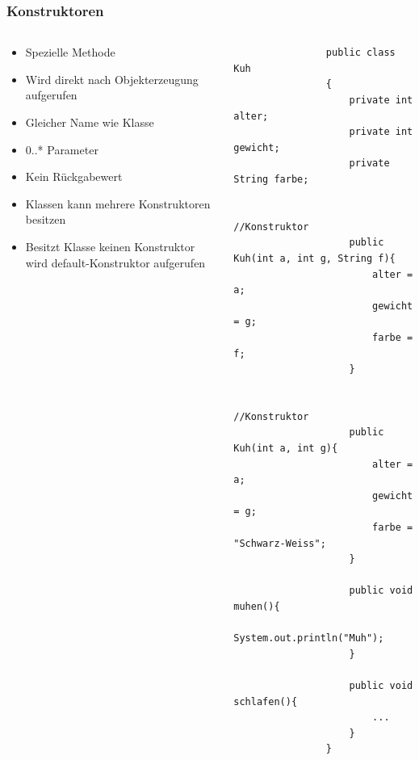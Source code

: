 \begin{frame}[fragile]
	\frametitle{Konstruktoren}
	\begin{columns}
		\begin{column}{0.5\textwidth}
			\small
			\begin{itemize}
			  \item Spezielle Methode
			  \item Wird direkt nach Objekterzeugung aufgerufen
			  \item Gleicher Name wie Klasse
			  \item 0..* Parameter
			  \item Kein R\"uckgabewert
			  \item Klassen kann mehrere Konstruktoren besitzen
			  \item Besitzt Klasse keinen Konstruktor wird 
			  default-Konstruktor aufgerufen
			\end{itemize}
		\end{column}
		\begin{column}{0.5\textwidth}
			\begin{lstlisting}
				public class Kuh
				{
					private int alter;
					private int gewicht;
					private String farbe;
					
					//Konstruktor  
					public Kuh(int a, int g, String f){
						alter = a;
						gewicht = g;
						farbe = f;
					}
					
					//Konstruktor  
					public Kuh(int a, int g){
						alter = a;
						gewicht = g;
						farbe = "Schwarz-Weiss";
					}
					
					public void muhen(){
						System.out.println("Muh");
					}
					
					public void schlafen(){
						...
					}
				} 
			\end{lstlisting}
		\end{column}
	\end{columns}
\end{frame}

